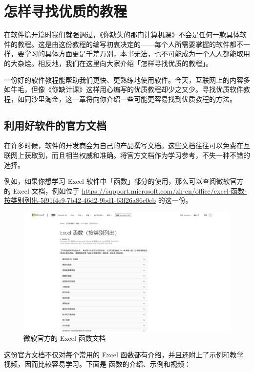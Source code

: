 \chapter{怎样寻找优质的教程}
\label{cha:how-to-find-tutorials}

\begin{intro}
  在软件篇开篇时我们就强调过，《你缺失的那门计算机课》不会是任何一款具体软件的教程。这是由这份教程的编写初衷决定的——每个人所需要掌握的软件都不一样，要学习的具体方面更是千差万别，本书无法，也不可能成为一个人人都能取用的大杂烩。相反地，我们在这里向大家介绍「怎样寻找优质的教程」。
\end{intro}

一份好的软件教程能帮助我们更快、更熟练地使用软件。今天，互联网上的内容多如牛毛，但像《你缺计课》这样用心编写的优质教程却少之又少。寻找优质软件教程，如同沙里淘金，这一章将向你介绍一些可能更容易找到优质教程的方法。

\section{利用好软件的官方文档}

在许多时候，软件的开发商会为自己的产品撰写文档。这些文档往往可以免费在互联网上获取到，而且相当权威和准确。将官方文档作为学习参考，不失一种不错的选择。

例如，如果你想学习 Excel 软件中「函数」部分的使用，那么可以查阅微软官方的 Excel 文档，例如位于 \url{https://support.microsoft.com/zh-cn/office/excel-函数-按类别列出-5f91f4e9-7b42-46d2-9bd1-63f26a86c0eb} 的这一份。

\begin{figure}[htb!]
  \centering
  \includegraphics[width=.85\textwidth]{assets/software/MS_document_for_Excel.png}
  \caption{微软官方的 Excel 函数文档}
  \label{fig:MS_document_for_Excel}
\end{figure}

这份官方文档不仅对每个常用的 Excel 函数都有介绍，并且还附上了示例和教学视频，因而比较容易学习。下面是  函数的介绍、示例和视频：

